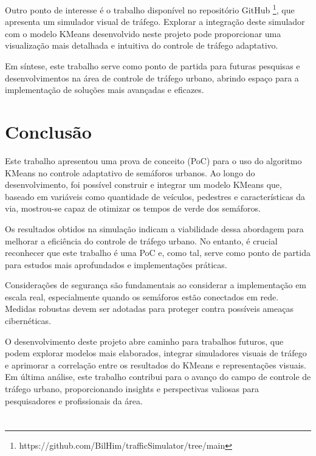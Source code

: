 \documentclass[a4paper, 10pt, conference]{IEEEtran}
\begin{document}
Outro ponto de interesse é o trabalho disponível no repositório GitHub \footnote{https://github.com/BilHim/trafficSimulator/tree/main}, que apresenta um simulador visual de tráfego. Explorar a integração deste simulador com o modelo KMeans desenvolvido neste projeto pode proporcionar uma visualização mais detalhada e intuitiva do controle de tráfego adaptativo.

Em síntese, este trabalho serve como ponto de partida para futuras pesquisas e desenvolvimentos na área de controle de tráfego urbano, abrindo espaço para a implementação de soluções mais avançadas e eficazes.


\section*{Conclusão}

Este trabalho apresentou uma prova de conceito (PoC) para o uso do algoritmo KMeans no controle adaptativo de semáforos urbanos. Ao longo do desenvolvimento, foi possível construir e integrar um modelo KMeans que, baseado em variáveis como quantidade de veículos, pedestres e características da via, mostrou-se capaz de otimizar os tempos de verde dos semáforos.

Os resultados obtidos na simulação indicam a viabilidade dessa abordagem para melhorar a eficiência do controle de tráfego urbano. No entanto, é crucial reconhecer que este trabalho é uma PoC e, como tal, serve como ponto de partida para estudos mais aprofundados e implementações práticas.

Considerações de segurança são fundamentais ao considerar a implementação em escala real, especialmente quando os semáforos estão conectados em rede. Medidas robustas devem ser adotadas para proteger contra possíveis ameaças cibernéticas.

O desenvolvimento deste projeto abre caminho para trabalhos futuros, que podem explorar modelos mais elaborados, integrar simuladores visuais de tráfego e aprimorar a correlação entre os resultados do KMeans e representações visuais. Em última análise, este trabalho contribui para o avanço do campo de controle de tráfego urbano, proporcionando insights e perspectivas valiosas para pesquisadores e profissionais da área.

\section*{} %
\end{document}
